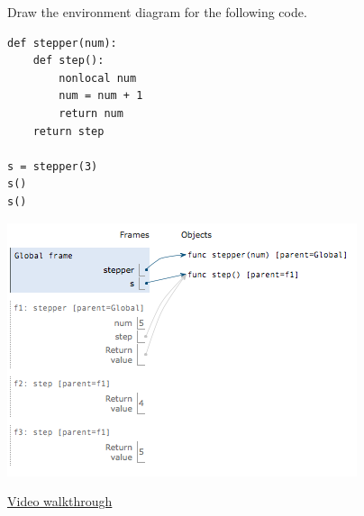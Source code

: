 \question Draw the environment diagram for the following code.

\begin{lstlisting}
def stepper(num):
    def step():
        nonlocal num
        num = num + 1
        return num
    return step

s = stepper(3)
s()
s()
\end{lstlisting}

\begin{solution}[4.0in]
\begin{center}
\includegraphics{stepper.png}
\end{center}
\href{https://www.youtube.com/watch?v=XsdTV6cAAjY&vq=hd1080&t=38m38s}{Video walkthrough}
\end{solution}
